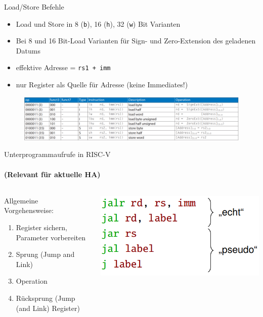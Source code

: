 \documentclass[
  german,            %
  aspectratio=169,    %
]{tumbeamer}
\begin{document}
\begin{frame}{Load/Store Befehle}
	\begin{itemize}
		\item Load und Store in 8 (\texttt{b}), 16 (\texttt{h}), 32 (\texttt{w}) Bit Varianten
		\item Bei 8 und 16 Bit-Load Varianten für Sign- und Zero-Extension des geladenen Datums
		\item effektive Adresse = \texttt{rs1 + imm}
		\item nur Register als Quelle für Adresse (keine Immediates!)
	\end{itemize}
	\begin{figure}
		\centering
		\includegraphics[width=.95\textwidth]{w03_loadbefehle.png}
	\end{figure}
\end{frame}

\begin{frame}[c]{Unterprogrammaufrufe in RISC-V}
  \framesubtitle{(Relevant für aktuelle HA)}
  \begin{columns}[c]
    \begin{column}{0.5\textwidth}
      Allgemeine Vorgehensweise:\\[.2cm] 
      \begin{enumerate}
        \item Register sichern, Parameter vorbereiten
        \item Sprung (Jump and Link)
        \item Operation
        \item Rücksprung (Jump (and Link) Register)
      \end{enumerate}
    \end{column}
    \begin{column}{0.4\textwidth}
      \includegraphics[width=\linewidth]{w03_jumpInstructionsWithPseudo_zue.png}
    \end{column}
  \end{columns}
\end{frame}
\end{document}
